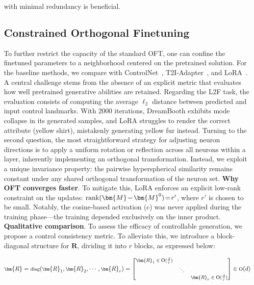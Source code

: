 with minimal redundancy is beneficial. \subsection{Constrained Orthogonal Finetuning}

To further restrict the capacity of the standard OFT, one can confine the finetuned parameters to a neighborhood centered on the pretrained solution. For the baseline methods, we compare with ControlNet~\cite{zhang2023adding}, T2I-Adapter~\cite{mou2023t2i}, and LoRA~\cite{hulora2022}. A central challenge stems from the absence of an explicit metric that evaluates how well pretrained generative abilities are retained. Regarding the L2F task, the evaluation consists of computing the average $\ell_2$ distance between predicted and input control landmarks. With 2000 iterations, DreamBooth exhibits mode collapse in its generated samples, and LoRA struggles to render the correct attribute (yellow shirt), mistakenly generating yellow fur instead. Turning to the second question, the most straightforward strategy for adjusting neuron directions is to apply a uniform rotation or reflection across all neurons within a layer, inherently implementing an orthogonal transformation. Instead, we exploit a unique invariance property: the pairwise hyperspherical similarity remains constant under any shared orthogonal transformation of the neuron set. \textbf{Why OFT converges faster}. To mitigate this, LoRA enforces an explicit low-rank constraint on the updates: $\thickmuskip=2mu \medmuskip=2mu \text{rank}(\bm{M} - \bm{M}^0)=r'$, where $r'$ is chosen to be small. Notably, the cosine-based activation (c) was never applied during the training phase—the training depended exclusively on the inner product. \textbf{Qualitative comparison}. To assess the efficacy of controllable generation, we propose a control consistency metric. To alleviate this, we introduce a block-diagonal structure for $\bm{R}$, dividing it into $r$ blocks, as expressed below:

\begin{equation}
    \footnotesize
    \bm{R}=\text{diag}(\bm{R}_1,\bm{R}_2,\cdots,\bm{R}_r)=\begin{bmatrix}
    \bm{R}_1\in \text{O}(\frac{d}{r}) &  &\\
    &\ddots & \\
    & & \bm{R}_r\in \text{O}(\frac{d}{r})
    \end{bmatrix}\in \text{O}(d)
\end{equation}

